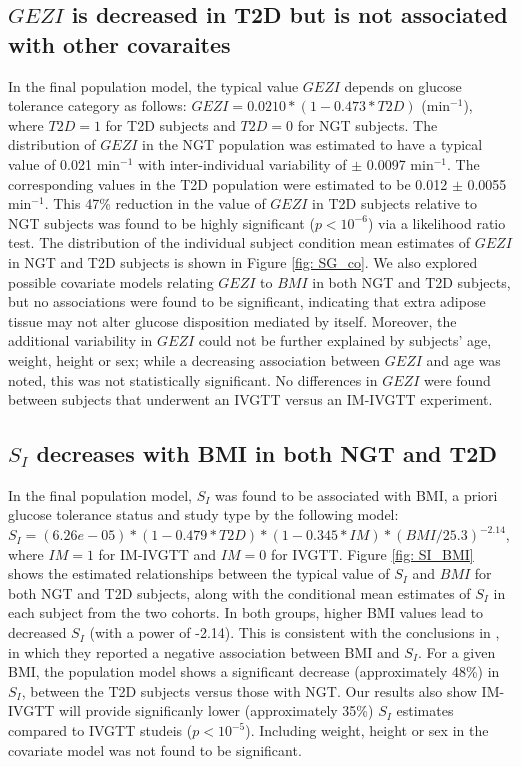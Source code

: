 \documentclass[utf8]{frontiersSCNS} %
\begin{document}
\vskip 0.5cm
\subsection{$GEZI$ is decreased in T2D but is not associated with other covaraites}
In the final population model, the typical value $GEZI$ depends on glucose tolerance category as follows: $GEZI=0.0210*(1-0.473*T2D)$ (min$^{-1}$), where $T2D=1$ for T2D subjects and $T2D=0$ for NGT subjects. The distribution of $GEZI$  in the NGT population was estimated to have a typical value of 0.021 min$^{-1}$  with inter-individual variability of $\pm$ 0.0097 min$^{-1}$. The corresponding values in the T2D population were estimated to be 0.012 $\pm$ 0.0055 min$^{-1}$. This 47\% reduction in the value of $GEZI$ in T2D subjects relative to NGT subjects was found to be highly significant ($p<10^{-6}$) via a likelihood ratio test. The distribution of the individual subject condition mean estimates of $GEZI$ in NGT and T2D subjects is shown in Figure \ref{fig: SG_co}. We also explored possible covariate models relating $GEZI$ to $BMI$ in both NGT and T2D subjects, but no associations were found to be significant, indicating that extra adipose tissue may not alter glucose disposition mediated by itself. Moreover, the additional variability in $GEZI$ could not be further explained by subjects’ age, weight, height or sex; while a decreasing association between $GEZI$ and age was noted, this was not statistically significant. No differences in $GEZI$ were found between subjects that underwent an IVGTT versus an IM-IVGTT experiment.

\vskip 0.5cm
\subsection{$S_I$ decreases with BMI in both NGT and T2D}
In the final population model, $S_I$ was found to be associated with BMI, a priori glucose tolerance status and study type by the following model: $S_I=(6.26e-05)*(1-0.479*T2D)*(1-0.345*IM)*(BMI/25.3)^{-2.14}$, where $IM=1$ for IM-IVGTT and $IM=0$ for IVGTT. Figure \ref{fig: SI_BMI} shows the estimated relationships between the typical value of $S_I$ and $BMI$ for both NGT and T2D subjects, along with the conditional mean estimates of $S_I$ in each subject from the two cohorts. In both groups, higher BMI values lead to decreased $S_I$ (with a power of -2.14). This is consistent with the conclusions in \citet{Bergman1997TheTolerance}, in which they reported a negative association between BMI and $S_I$. For a given BMI, the population model shows a significant decrease (approximately 48\%) in $S_I$, between the T2D subjects versus those with NGT. Our results also show IM-IVGTT will provide significanly lower (approximately 35\%) $S_I$ estimates compared to IVGTT studeis ($p<10^{-5}$). Including weight, height or sex in the covariate model was not found to be significant.\\
\end{document}
